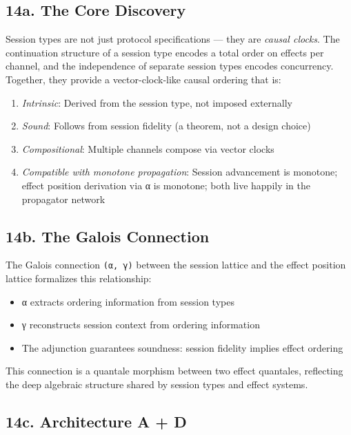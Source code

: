 \documentclass[11pt]{article}
\begin{document}
\subsection{14a. The Core Discovery}
\label{sec:org695231a}

Session types are not just protocol specifications — they are \emph{causal clocks}.
The continuation structure of a session type encodes a total order on effects
per channel, and the independence of separate session types encodes concurrency.
Together, they provide a vector-clock-like causal ordering that is:

\begin{enumerate}
\item \emph{Intrinsic}: Derived from the session type, not imposed externally
\item \emph{Sound}: Follows from session fidelity (a theorem, not a design choice)
\item \emph{Compositional}: Multiple channels compose via vector clocks
\item \emph{Compatible with monotone propagation}: Session advancement is monotone;
effect position derivation via α is monotone; both live happily in the
propagator network
\end{enumerate}
\subsection{14b. The Galois Connection}
\label{sec:orga7dadaa}

The Galois connection \texttt{(α, γ)} between the session lattice and the effect
position lattice formalizes this relationship:

\begin{itemize}
\item α extracts ordering information from session types
\item γ reconstructs session context from ordering information
\item The adjunction guarantees soundness: session fidelity implies effect ordering
\end{itemize}

This connection is a quantale morphism between two effect quantales, reflecting
the deep algebraic structure shared by session types and effect systems.
\subsection{14c. Architecture A + D}
\label{sec:orgaac2959}
\end{document}
